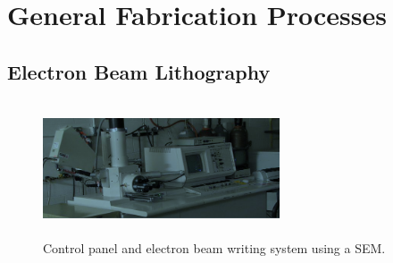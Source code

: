 \section{General Fabrication Processes}\label{sec:fab_processes}

\subsection{Electron Beam Lithography}\label{subsec:ebl}
\begin{figure}[ht]
    \centering
    \includegraphics[height=4cm,width=7cm]{SEM}
    \caption[Scanning electron microscope]{Control panel and electron beam writing system using a \acs{SEM}.}
    \label{fig:sem}
\end{figure} 

